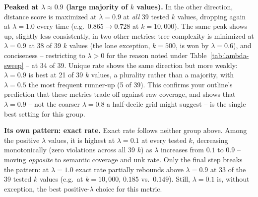 \textbf{Peaked at $\lambda \approx 0.9$ (large majority of $k$ values).} In
the other direction, distance score is maximized at $\lambda=0.9$ at
\emph{all} 39 tested $k$ values, dropping again at $\lambda=1.0$ every time
(e.g.\ $0.865 \to 0.728$ at $k=10{,}000$). The same peak shows up, slightly
less consistently, in two other metrics: tree complexity is minimized at
$\lambda=0.9$ at 38 of 39 $k$ values (the lone exception, $k=500$, is won by
$\lambda=0.6$), and conciseness -- restricting to $\lambda>0$ for the reason
noted under Table~\ref{tab:lambda-sweep} -- at 34 of 39. Unique rate shows
the same direction but more weakly: $\lambda=0.9$ is best at 21 of 39 $k$
values, a plurality rather than a majority, with $\lambda=0.5$ the most
frequent runner-up (5 of 39). This confirms your outline's prediction that
these metrics trade off against raw coverage, and shows that $\lambda=0.9$
-- not the coarser $\lambda=0.8$ a half-decile grid might suggest -- is the
single best setting for this group.

\textbf{Its own pattern: exact rate.} Exact rate follows neither group
above. Among the positive $\lambda$ values, it is highest at $\lambda=0.1$
at every tested $k$, decreasing monotonically (zero violations across all
39 $k$) as $\lambda$ increases from $0.1$ to $0.9$ -- moving \emph{opposite}
to semantic coverage and unk rate. Only the final step breaks the pattern:
at $\lambda=1.0$ exact rate partially rebounds above $\lambda=0.9$ at 33 of
the 39 tested $k$ values (e.g.\ at $k=10{,}000$, $0.185$ vs.\ $0.149$).
Still, $\lambda=0.1$ is, without exception, the best positive-$\lambda$
choice for this metric.

